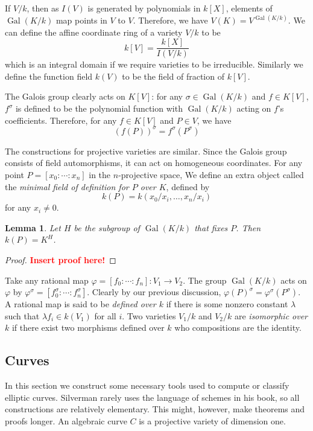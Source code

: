 \documentclass[12pt]{article}
\newtheorem{lemma}{Lemma}[subsection]
\theoremstyle{remark}
\newcommand{\s}[0]{\sigma}
\newcommand{\Gal}[0]{\operatorname{Gal}}
\begin{document}
        If $V/k$, then as $I(V)$ is generated by polynomials in $k[X]$, elements of $\Gal(K/k)$ map points in $V$ to $V$. Therefore, we have $V(K)=V^{\Gal(K/k)}$. We can define the affine coordinate ring of a variety $V/k$ to be
        \[k[V]=\frac{k[X]}{I(V/k)}\]
        which is an integral domain if we require varieties to be irreducible. Similarly we define the function field $k(V)$ to be the field of fraction of $k[V]$.

        The Galois group clearly acts on $K[V]$: for any $\sigma\in\Gal(K/k)$ and $f\in K[V]$, $f^{\s}$ is defined to be the polynomial function with $\Gal(K/k)$ acting on $f$'s coefficients. Therefore, for any $f\in K[V]$ and $P\in V$, we have
        \[\left(f(P)\right)^\s=f^\s\left(P^\s\right)\]
    
        The constructions for projective varieties are similar. Since the Galois group consists of field automorphisms, it can act on homogeneous coordinates. For any point $P=[x_0:\cdots:x_n]$ in the $n$-projective space, We define an extra object called the \textit{minimal field of definition for $P$ over $K$}, defined by
        \[k(P)=k(x_0/x_i,\dots, x_n/x_i)\]
        for any $x_i\neq 0$.
        \begin{lemma}
            Let $H$ be the subgroup of $\Gal(K/k)$ that fixes $P$. Then $k(P)=K^H$.
        \end{lemma}
        \begin{proof}
            \textcolor{red}{\textbf{Insert proof here!}}
        \end{proof}
        
        Take any rational map $\varphi=[f_0:\cdots:f_n]:V_1\to V_2$. The group $\Gal(K/k)$ acts on $\varphi$ by $\varphi^\s=[f_0^\s:\cdots:f_n^\s]$. Clearly by our previous discussion, $\varphi(P)^\s=\varphi^\s(P^\s)$. A rational map is said to be \textit{defined over $k$} if there is some nonzero constant $\lambda$ such that $\lambda f_i\in k(V_1)$ for all $i$. Two varieties $V_1/k$ and $V_2/k$ are \textit{isomorphic over $k$} if there exist two morphisms defined over $k$ who compositions are the identity.

        \subsection{Curves}\label{ssec-curves-basic}
        In this section we construct some necessary tools used to compute or classify elliptic curves. Silverman rarely uses the language of schemes in his book, so all constructions are relatively elementary. This might, however, make theorems and proofs longer. An algebraic curve $C$ is a projective variety of dimension one.
\end{document}
